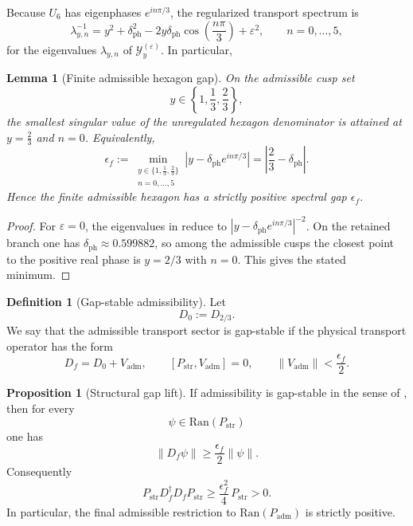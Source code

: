 \documentclass[11pt,a4paper]{article}
\newtheorem{lemma}[theorem]{Lemma}
\theoremstyle{definition}
\newtheorem{definition}[theorem]{Definition}
\newtheorem{proposition}[theorem]{Proposition}
\theoremstyle{remark}
\newcommand{\Padm}{P_{\mathrm{adm}}}
\begin{document}
Because $U_6$ has eigenphases $e^{in\pi/3}$, the regularized transport spectrum is
\begin{equation}
\label{eq:transport-spectrum}
\lambda_{y,n}^{-1}
=
y^2+\delta_{\mathrm{ph}}^2-2y\delta_{\mathrm{ph}}\cos\!\left(\frac{n\pi}{3}\right)+\varepsilon^2,
\qquad
n=0,\dots,5,
\end{equation}
for the eigenvalues $\lambda_{y,n}$ of $\mathcal Y_y^{(\varepsilon)}$. In particular,
\begin{lemma}[Finite admissible hexagon gap]
\label{lem:finite-admissible-hexagon-gap}
On the admissible cusp set
\[
y\in\left\{1,\frac13,\frac23\right\},
\]
the smallest singular value of the unregulated hexagon denominator is attained at $y=\frac23$ and $n=0$. Equivalently,
\[
\epsilon_f
:=
\min_{\substack{y\in\{1,\frac13,\frac23\}\\ n=0,\dots,5}}
\left|y-\delta_{\mathrm{ph}}e^{in\pi/3}\right|
=
\left|\frac23-\delta_{\mathrm{ph}}\right|.
\]
Hence the finite admissible hexagon has a strictly positive spectral gap $\epsilon_f$.
\end{lemma}

\begin{proof}
For $\varepsilon=0$, the eigenvalues in  reduce to $|y-\delta_{\mathrm{ph}}e^{in\pi/3}|^{-2}$. On the retained branch one has $\delta_{\mathrm{ph}}\approx \num{0.599882}$, so among the admissible cusps the closest point to the positive real phase is $y=2/3$ with $n=0$. This gives the stated minimum.
\end{proof}

\begin{definition}[Gap-stable admissibility]
\label{def:gap-stable-admissibility}
Let
\[
D_0:=D_{2/3}.
\]
We say that the admissible transport sector is gap-stable if the physical transport operator has the form
\[
D_f=D_0+V_{\mathrm{adm}},
\qquad
[P_{\mathrm{str}},V_{\mathrm{adm}}]=0,
\qquad
\|V_{\mathrm{adm}}\|<\frac{\epsilon_f}{2}.
\]
\end{definition}

\begin{proposition}[Structural gap lift]
\label{prop:gap-lift-full-operator}
If admissibility is gap-stable in the sense of , then for every
\[
\psi\in\mathrm{Ran}(P_{\mathrm{str}})
\]
one has
\[
\|D_f\psi\|
\ge
\frac{\epsilon_f}{2}\|\psi\|.
\]
Consequently
\begin{equation}
\label{eq:gap-lift-full-operator}
P_{\mathrm{str}} D_f^\dagger D_f P_{\mathrm{str}}
\ge
\frac{\epsilon_f^2}{4}\,P_{\mathrm{str}}
>
0.
\end{equation}
In particular, the final admissible restriction to $\mathrm{Ran}(\Padm)$ is strictly positive.
\end{proposition}
\end{document}
